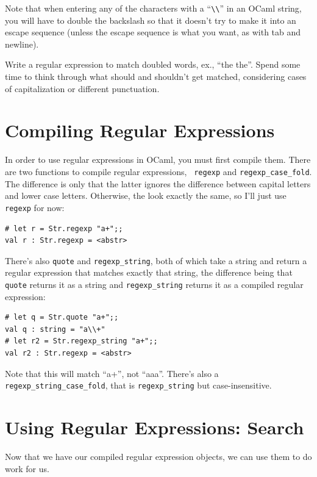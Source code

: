 \documentclass[10pt]{book}
\begin{document}
Note that when entering any of the characters with a ``\verb"\\"'' in an OCaml string, you will have to double the backslash so that it doesn't try to make it into an escape sequence (unless the escape sequence is what you want, as with tab and newline).

\begin{ex} \label{ex:regex_doubles}
Write a regular expression to match doubled words, ex., ``the the''. Spend some time to think through what should and shouldn't get matched, considering cases of capitalization or different punctuation.
\end{ex}

\section{Compiling Regular Expressions}

In order to use regular expressions in OCaml, you must first compile
them. There are two functions to compile regular expressions, {\tt
  regexp} and {\tt regexp\_case\_fold}. The difference is only that the
latter ignores the difference between capital letters and lower case
letters. Otherwise, the look exactly the same, so I'll just use {\tt
  regexp} for now:

\beforeverb
\begin{verbatim}
# let r = Str.regexp "a+";;
val r : Str.regexp = <abstr>
\end{verbatim}
\afterverb

There's also {\tt quote} and {\tt regexp\_string}, both of which take a string and return a regular expression that matches exactly that string, the difference being that {\tt quote} returns it as a string and {\tt regexp\_string} returns it as a compiled regular expression:
\beforeverb
\begin{verbatim}
# let q = Str.quote "a+";;
val q : string = "a\\+"
# let r2 = Str.regexp_string "a+";;
val r2 : Str.regexp = <abstr>
\end{verbatim}
\afterverb
Note that this will match ``a+'', not ``aaa''. There's also a {\tt regexp\_string\_case\_fold}, that is {\tt regexp\_string} but case-insensitive.

\section{Using Regular Expressions: Search}

Now that we have our compiled regular expression objects, we can use them to do work for us.
\end{document}
